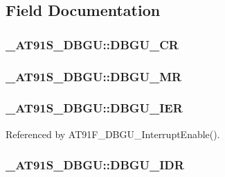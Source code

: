 \subsection{Field Documentation}
\hypertarget{struct__AT91S__DBGU_c0ec2f327fe14ffd3d8713273ac9a297}{
\subsubsection{ {\bf \_\-AT91S\_\-DBGU::DBGU\_\-CR}}}
\label{struct__AT91S__DBGU_c0ec2f327fe14ffd3d8713273ac9a297}


\hypertarget{struct__AT91S__DBGU_6a42e275e70b1489101ce27630a163d3}{
\subsubsection{ {\bf \_\-AT91S\_\-DBGU::DBGU\_\-MR}}}
\label{struct__AT91S__DBGU_6a42e275e70b1489101ce27630a163d3}


\hypertarget{struct__AT91S__DBGU_505e9f99d4497c2731ec97c61e75987b}{
\subsubsection{ {\bf \_\-AT91S\_\-DBGU::DBGU\_\-IER}}}
\label{struct__AT91S__DBGU_505e9f99d4497c2731ec97c61e75987b}




Referenced by AT91F\_\-DBGU\_\-InterruptEnable().\hypertarget{struct__AT91S__DBGU_f059becb6730b21339608a53635c78f5}{
\subsubsection{ {\bf \_\-AT91S\_\-DBGU::DBGU\_\-IDR}}}
\label{struct__AT91S__DBGU_f059becb6730b21339608a53635c78f5}




